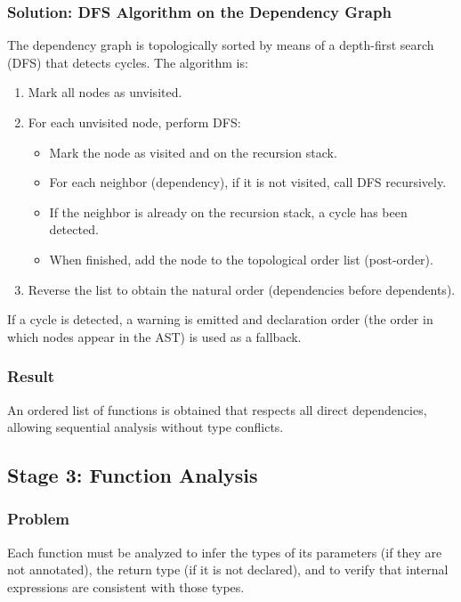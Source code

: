 \documentclass[12pt,a4paper]{report}
\begin{document}
\subsubsection{Solution: DFS Algorithm on the Dependency Graph}

The dependency graph is topologically sorted by means of a depth-first search (DFS) that detects cycles.
The algorithm is:

\begin{enumerate}
    \item Mark all nodes as unvisited.
    \item For each unvisited node, perform DFS:
    \begin{itemize}
        \item Mark the node as visited and on the recursion stack.
        \item For each neighbor (dependency), if it is not visited, call DFS recursively.
        \item If the neighbor is already on the recursion stack, a cycle has been detected.
        \item When finished, add the node to the topological order list (post-order).
    \end{itemize}
    \item Reverse the list to obtain the natural order (dependencies before dependents).
\end{enumerate}

If a cycle is detected, a warning is emitted and declaration order (the order in which nodes appear in the AST) is used as a fallback.

\subsubsection{Result}
An ordered list of functions is obtained that respects all direct dependencies,
allowing sequential analysis without type conflicts.

\subsection{Stage 3: Function Analysis}

\subsubsection{Problem}
Each function must be analyzed to infer the types of its parameters (if they are not annotated),
the return type (if it is not declared), and to verify that internal expressions are consistent with those types.
\end{document}
